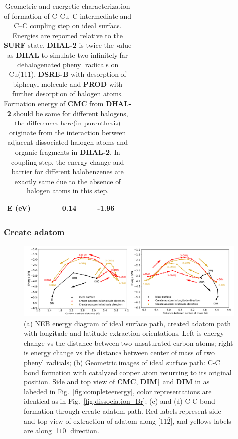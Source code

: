 \documentclass[%
 reprint,
 amsmath,amssymb,
 aps,
prb,
floatfix,
]{revtex4-2}
\begin{document}
\begin{table}
\begin{tabular}{ lccccccccc  }
 \hline
 E (\si{\electronvolt})~\cite{jacs2013} & & & & 0.14 & & & -1.96 & &\\
 \hline
 \hline
\end{tabular}
\caption{Geometric and energetic characterization of formation of C--Cu--C intermediate and C--C coupling step on ideal surface. Energies are reported relative to the \textbf{SURF} state. \textbf{DHAL-2} is twice the value as \textbf{DHAL} to simulate two infinitely far dehalogenated phenyl radicals on Cu(111), \textbf{DSRB-B} with desorption of biphenyl molecule and \textbf{PROD} with further desorption of halogen atoms. Formation energy of \textbf{CMC} from \textbf{DHAL-2} should be same for different halogens, the differences here(in parenthesis) originate from the interaction between adjacent dissociated halogen atoms and organic fragments in \textbf{DHAL-2}. In coupling step, the energy change and barrier for different halobenzenes are exactly same due to the absence of halogen atoms in this step.}
\label{table:idealsurface}
\end{table}


\subsubsection{Create adatom}

\begin{figure}[hbt]
\centering
\includegraphics[width=1.0\textwidth]{Fig/distance-energy.pdf}
\caption{(a) NEB energy diagram of ideal surface path, created adatom path with longitude and latitude extraction orientations. Left is energy change vs the distance between two unsaturated carbon atoms; right is energy change vs the distance between center of mass of two phenyl radicals; (b) Geometric images of ideal surface path: C-C bond formation with catalyzed copper atom returning to its original position. Side and top view of \textbf{CMC}, \textbf{DIM$\ddagger$} and \textbf{DIM} in as labeded in Fig.~\ref{fig:completeenergy}, color representations are identical as in Fig.~\ref{fig:dissociation_Br}; (c) and (d) C-C bond formation through create adatom path. Red labels represent side and top view of extraction of adatom along [11$\overline{2}$], and yellows labels are along [1$\overline{1}$0] direction.}
\label{fig:distance-energy}
\end{figure}
\end{document}
